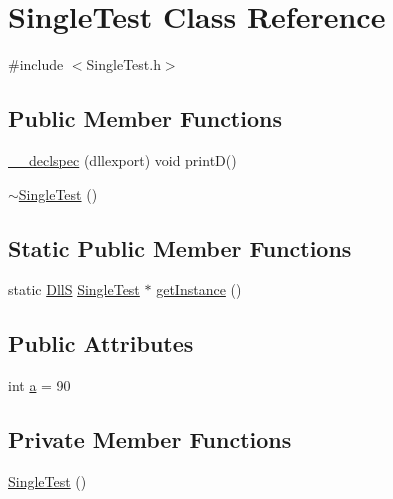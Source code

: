 \hypertarget{class_single_test}{}\section{Single\+Test Class Reference}
\label{class_single_test}


{\ttfamily \#include $<$Single\+Test.\+h$>$}

\subsection*{Public Member Functions}
\begin{DoxyCompactItemize}
\item 
\mbox{\hyperlink{class_single_test_a7ddadb374d069d20b623ca1179b6aa76}{\+\_\+\+\_\+declspec}} (dllexport) void printD()
\item 
\mbox{\hyperlink{class_single_test_a28ed67f04351e54d43f02e2ce49c762d}{$\sim$\+Single\+Test}} ()
\end{DoxyCompactItemize}
\subsection*{Static Public Member Functions}
\begin{DoxyCompactItemize}
\item 
static \mbox{\hyperlink{_single_test_8h_ac612533c84ec9f58274935ca41422bc2}{DllS}} \mbox{\hyperlink{class_single_test}{Single\+Test}} $\ast$ \mbox{\hyperlink{class_single_test_a89f891861a229275091318f9094de769}{get\+Instance}} ()
\end{DoxyCompactItemize}
\subsection*{Public Attributes}
\begin{DoxyCompactItemize}
\item 
int \mbox{\hyperlink{class_single_test_a558fbfcc1f8df7083512ebdb74114885}{a}} = 90
\end{DoxyCompactItemize}
\subsection*{Private Member Functions}
\begin{DoxyCompactItemize}
\item 
\mbox{\hyperlink{class_single_test_a1b9be20473939c703da97fc27fe896f5}{Single\+Test}} ()
\end{DoxyCompactItemize}


